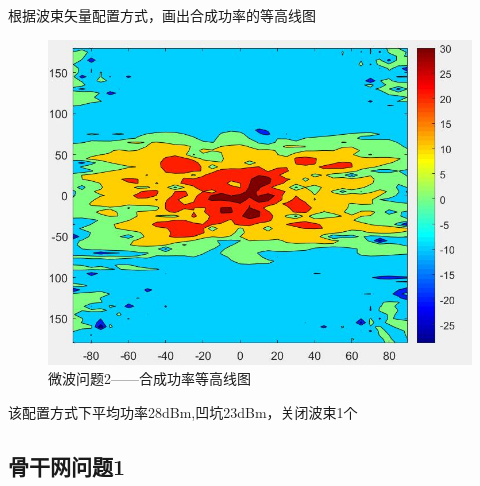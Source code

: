 \documentclass[UTF8,12pt]{ctexart}
\begin{document}
根据波束矢量配置方式，画出合成功率的等高线图
\begin{figure}[H]
    \centering
    \includegraphics[scale=0.5]{h2.jpg}
    \caption{微波问题2——合成功率等高线图}
\end{figure}
该配置方式下平均功率28dBm,凹坑23dBm，关闭波束1个



\subsection{骨干网问题1}
\end{document}

